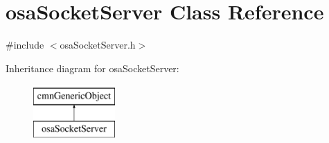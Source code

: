 \hypertarget{classosa_socket_server}{\section{osa\-Socket\-Server Class Reference}
\label{classosa_socket_server}
}


{\ttfamily \#include $<$osa\-Socket\-Server.\-h$>$}

Inheritance diagram for osa\-Socket\-Server\-:\begin{figure}[H]
\begin{center}
\leavevmode
\includegraphics[height=2.000000cm]{dd/d83/classosa_socket_server}
\end{center}
\end{figure}
